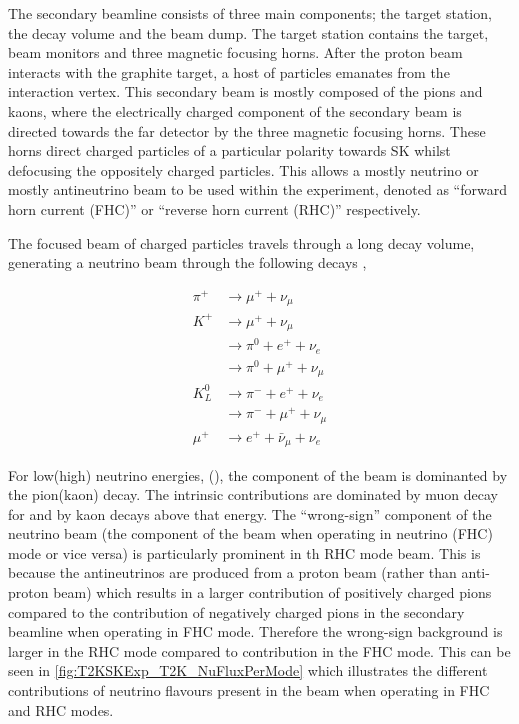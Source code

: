 The secondary beamline consists of three main components; the target station, the decay volume and the beam dump. The target station contains the target, beam monitors and three magnetic focusing horns. After the proton beam interacts with the graphite target, a host of particles emanates from the interaction vertex. This secondary beam is mostly composed of the pions and kaons, where the electrically charged component of the secondary beam is directed towards the far detector by the three magnetic focusing horns. These horns direct charged particles of a particular polarity towards SK whilst defocusing the oppositely charged particles. This allows a mostly neutrino or mostly antineutrino beam to be used within the experiment, denoted as ``forward horn current (FHC)'' or ``reverse horn current (RHC)'' respectively.

The focused beam of charged particles travels through a  long decay volume, generating a neutrino beam through the following decays \cite{Abe_2013},

\begin{equation}
  \begin{split}
    \pi^+ &\rightarrow \mu^+ + \nu_\mu \\
    K^+ &\rightarrow \mu^+ + \nu_\mu \\
    &\rightarrow \pi^0 + e^+ + \nu_e \\
    &\rightarrow \pi^0 + \mu^+ + \nu_\mu \\
    K^0_L &\rightarrow \pi^- + e^+ + \nu_e \\
    &\rightarrow \pi^- + \mu^+ + \nu_\mu \\
    \mu^+ &\rightarrow e^+ + \bar{\nu}_\mu + \nu_e
  \end{split}
\end{equation}

For low(high) neutrino energies, (), the \quickmath{\nu_\mu} component of the beam is dominanted by the pion(kaon) decay. The intrinsic  contributions are dominated by muon decay for  and by kaon decays above that energy. The ``wrong-sign'' component of the neutrino beam (the \quickmath{\bar{\nu}_\mu} component of the beam when operating in neutrino (FHC) mode or vice versa) is particularly prominent in th RHC mode beam. This is because the antineutrinos are produced from a proton beam (rather than anti-proton beam) which results in a larger contribution of positively charged pions compared to the contribution of negatively charged pions in the secondary beamline when operating in FHC mode. Therefore the wrong-sign background is larger in the RHC mode compared to contribution in the FHC mode. This can be seen in \autoref{fig:T2KSKExp_T2K_NuFluxPerMode} which illustrates the different contributions of neutrino flavours present in the beam when operating in FHC and RHC modes.

